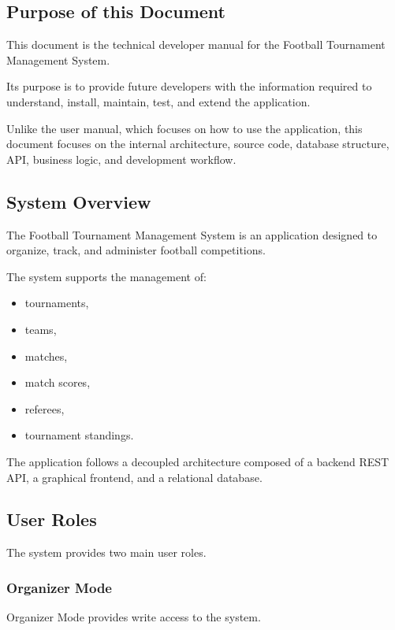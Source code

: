 \documentclass[12pt,a4paper]{article}
\begin{document}
\subsection{Purpose of this Document}

This document is the technical developer manual for the
Football Tournament Management System.

Its purpose is to provide future developers with the information
required to understand, install, maintain, test, and extend the
application.

Unlike the user manual, which focuses on how to use the application,
this document focuses on the internal architecture, source code,
database structure, API, business logic, and development workflow.

\subsection{System Overview}

The Football Tournament Management System is an application designed
to organize, track, and administer football competitions.

The system supports the management of:

\begin{itemize}
    \item tournaments,
    \item teams,
    \item matches,
    \item match scores,
    \item referees,
    \item tournament standings.
\end{itemize}

The application follows a decoupled architecture composed of a
backend REST API, a graphical frontend, and a relational database.

\subsection{User Roles}

The system provides two main user roles.

\subsubsection{Organizer Mode}

Organizer Mode provides write access to the system.
\end{document}
